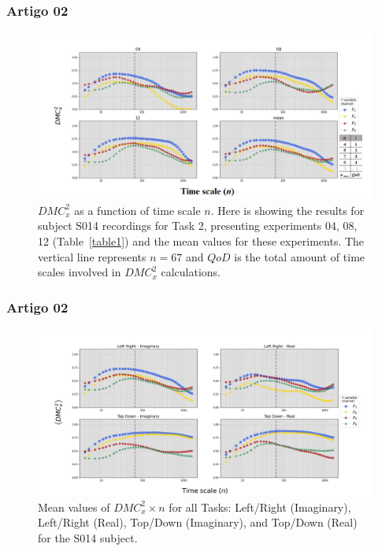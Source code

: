 \documentclass[11pt, aspectratio=169]{beamer}
\begin{document}
\begin{frame}
  \frametitle{Artigo 02}

  \begin{figure}[!h]
    \includegraphics[height=.5\paperheight]{../Figures/art_02/Fig2.png}
    \caption{$DMC_{x}^{2}$ as a function of time scale $n$. Here is showing the results for subject S014 recordings for Task 2, presenting experiments 04, 08, 12 (Table~\ref{table1}) and the mean values for these experiments. The vertical line represents $n=67$ and $QoD$ is the total amount of time scales involved in $DMC_{x}^{2}$ calculations.}
    \label{fig02}
  \end{figure}
\end{frame}


\begin{frame}
  \frametitle{Artigo 02}

  \begin{figure}[!h]
    \includegraphics[height=.5\paperheight]{../Figures/art_02/Fig3.jpg}
    \caption{Mean values of $DMC_{x}^{2} \times n$ for all Tasks: Left/Right (Imaginary), Left/Right (Real), Top/Down (Imaginary), and Top/Down (Real) for the S014 subject.}
    \label{fig03}
  \end{figure}
\end{frame}
\end{document}

